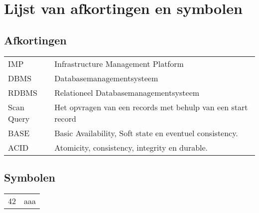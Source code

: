 \chapter{Lijst van afkortingen en symbolen}
\section*{Afkortingen}
\begin{flushleft}
  \renewcommand{\arraystretch}{1.1}
  \begin{tabularx}{\textwidth}{@{}p{12mm}X@{}}
    IMP   & Infrastructure Management Platform \\
    DBMS   & Databasemanagementsysteem \\
    RDBMS   & Relationeel Databasemanagementsysteem \\
    Scan Query & Het opvragen van een records met behulp van een start record  \\
    BASE & Basic Availability, Soft state en eventuel consistency.  \\
    ACID & Atomicity, consistency, integrity en durable.  \\
  \end{tabularx}
\end{flushleft}
\section*{Symbolen}
\begin{flushleft}
  \renewcommand{\arraystretch}{1.1}
  \begin{tabularx}{\textwidth}{@{}p{12mm}X@{}}
    42    & aaa \\
  \end{tabularx}
\end{flushleft}